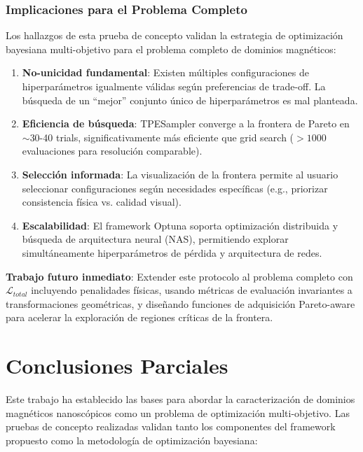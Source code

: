 \documentclass[12pt]{article}
\begin{document}
\subsubsection{Implicaciones para el Problema Completo}

Los hallazgos de esta prueba de concepto validan la estrategia de optimización bayesiana multi-objetivo para el problema completo de dominios magnéticos:

\begin{enumerate}
    \item \textbf{No-unicidad fundamental}: Existen múltiples configuraciones de hiperparámetros igualmente válidas según preferencias de trade-off. La búsqueda de un ``mejor'' conjunto único de hiperparámetros es mal planteada.

    \item \textbf{Eficiencia de búsqueda}: TPESampler converge a la frontera de Pareto en $\sim$30-40 trials, significativamente más eficiente que grid search ($> 1000$ evaluaciones para resolución comparable).

    \item \textbf{Selección informada}: La visualización de la frontera permite al usuario seleccionar configuraciones según necesidades específicas (e.g., priorizar consistencia física vs. calidad visual).

    \item \textbf{Escalabilidad}: El framework Optuna soporta optimización distribuida y búsqueda de arquitectura neural (NAS), permitiendo explorar simultáneamente hiperparámetros de pérdida y arquitectura de redes.
\end{enumerate}

\textbf{Trabajo futuro inmediato}: Extender este protocolo al problema completo con $\mathcal{L}_{total}$ incluyendo penalidades físicas, usando métricas de evaluación invariantes a transformaciones geométricas, y diseñando funciones de adquisición Pareto-aware para acelerar la exploración de regiones críticas de la frontera.

\section{Conclusiones Parciales}

Este trabajo ha establecido las bases para abordar la caracterización de dominios magnéticos nanoscópicos como un problema de optimización multi-objetivo. Las pruebas de concepto realizadas validan tanto los componentes del framework propuesto como la metodología de optimización bayesiana:
\end{document}
